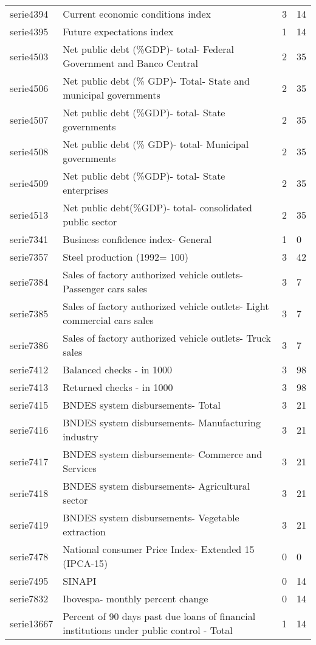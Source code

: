 \documentclass{article}
\begin{document}
\begin{landscape}
\begin{center}
\begin{longtable}{|l|l|l|l|}
serie4394 & Current economic conditions index & 3 & 14 \\
serie4395 & Future expectations index & 1 & 14 \\
serie4503 & Net public debt (\%GDP)- total- Federal Government and Banco Central & 2 & 35 \\
serie4506 & Net public debt (\% GDP)- Total- State and municipal governments & 2 & 35 \\
serie4507 & Net public debt (\%GDP)- total- State governments & 2 & 35 \\
serie4508 & Net public debt (\% GDP)- total- Municipal governments & 2 & 35 \\
serie4509 & Net public debt (\%GDP)- total- State enterprises & 2 & 35 \\
serie4513 & Net public debt(\%GDP)- total- consolidated public sector & 2 & 35 \\
serie7341 & Business confidence index- General & 1 & 0 \\
serie7357 & Steel production (1992= 100) & 3 & 42 \\
serie7384 & Sales of factory authorized vehicle outlets- Passenger cars sales & 3 & 7 \\
serie7385 & Sales of factory authorized vehicle outlets- Light commercial cars sales & 3 & 7 \\
serie7386 & Sales of factory authorized vehicle outlets- Truck sales & 3 & 7 \\
serie7412 & Balanced checks - in 1000 & 3 & 98 \\
serie7413 & Returned checks - in 1000 & 3 & 98 \\
serie7415 & BNDES system disbursements- Total & 3 & 21 \\
serie7416 & BNDES system disbursements- Manufacturing industry & 3 & 21 \\
serie7417 & BNDES system disbursements- Commerce and Services & 3 & 21 \\
serie7418 & BNDES system disbursements- Agricultural sector & 3 & 21 \\
serie7419 & BNDES system disbursements- Vegetable extraction & 3 & 21 \\
serie7478 & National consumer Price Index- Extended 15 (IPCA-15) & 0 & 0 \\
serie7495 & SINAPI & 0 & 14 \\
serie7832 & Ibovespa- monthly percent change & 0 & 14 \\
serie13667 & Percent of 90 days past due loans of financial institutions under public control - Total & 1 & 14 \\

\end{longtable}
\end{center}
\end{landscape}
\end{document}
